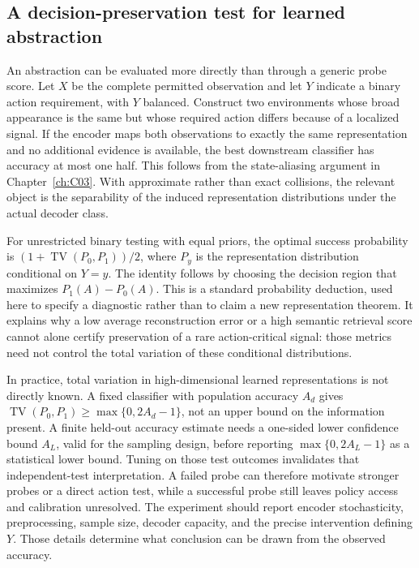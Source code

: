 \subsection{A decision-preservation test for learned abstraction}
\label{sec:C05:decisiontest}
An abstraction can be evaluated more directly than through a generic probe score. Let $X$ be the complete permitted observation and let $Y$ indicate a binary action requirement, with $Y$ balanced. Construct two environments whose broad appearance is the same but whose required action differs because of a localized signal. If the encoder maps both observations to exactly the same representation and no additional evidence is available, the best downstream classifier has accuracy at most one half. This follows from the state-aliasing argument in Chapter~\ref{ch:C03}. With approximate rather than exact collisions, the relevant object is the separability of the induced representation distributions under the actual decoder class.

For unrestricted binary testing with equal priors, the optimal success probability is $(1+\operatorname{TV}(P_0,P_1))/2$, where $P_y$ is the representation distribution conditional on $Y=y$. The identity follows by choosing the decision region that maximizes $P_1(A)-P_0(A)$. This is a standard probability deduction, used here to specify a diagnostic rather than to claim a new representation theorem. It explains why a low average reconstruction error or a high semantic retrieval score cannot alone certify preservation of a rare action-critical signal: those metrics need not control the total variation of these conditional distributions.

In practice, total variation in high-dimensional learned representations is not directly known. A fixed classifier with population accuracy $A_d$ gives $\operatorname{TV}(P_0,P_1)\geq\max\{0,2A_d-1\}$, not an upper bound on the information present. A finite held-out accuracy estimate needs a one-sided lower confidence bound $A_L$, valid for the sampling design, before reporting $\max\{0,2A_L-1\}$ as a statistical lower bound. Tuning on those test outcomes invalidates that independent-test interpretation. A failed probe can therefore motivate stronger probes or a direct action test, while a successful probe still leaves policy access and calibration unresolved. The experiment should report encoder stochasticity, preprocessing, sample size, decoder capacity, and the precise intervention defining $Y$. Those details determine what conclusion can be drawn from the observed accuracy.

